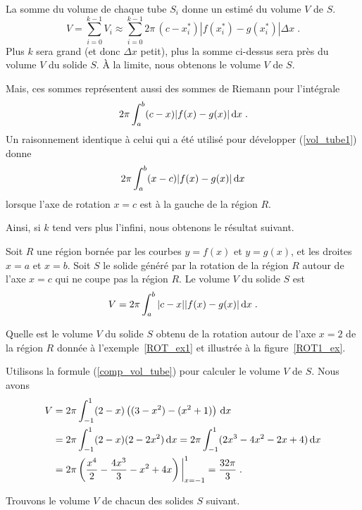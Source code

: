 {La somme du volume de chaque tube $S_i$ donne un estimé du volume $V$ de
$S$.
\[
V = \sum_{i=0}^{k-1} V_i \approx \sum_{i=0}^{k-1}
2 \pi \, (c-x_i^\ast) |f(x_i^\ast)-g(x_i^\ast)| \Delta x \; .
\]
Plus $k$ sera grand (et donc $\Delta x$ petit), plus la somme ci-dessus sera
près du volume $V$ du solide $S$.  À la limite, nous obtenons le volume $V$ de
$S$.

Mais, ces sommes représentent aussi des sommes de Riemann pour l'intégrale
\begin{equation}\label{vol_tube1}
2 \pi \int_a^b (c-x) |f(x)-g(x)| \,\mathrm{d}x \; .
\end{equation}
Un raisonnement identique à celui qui a été utilisé pour développer
(\ref{vol_tube1}) donne
\[
2 \pi \int_a^b (x-c) |f(x)-g(x)| \,\mathrm{d}x
\]
lorsque l'axe de rotation $x=c$ est à la gauche de la région $R$.

Ainsi, si $k$ tend vers plus l'infini, nous obtenons le résultat suivant.

\begin{meth}
Soit $R$ une région bornée par les courbes $y=f(x)$ et $y=g(x)$, et les
droites $x=a$ et $x=b$.  Soit $S$ le solide généré par la rotation de la
région $R$ autour de l'axe $x=c$ qui ne coupe pas la région $R$. Le volume
$V$ du solide $S$ est
\begin{equation}\label{comp_vol_tube}
V = 2 \pi \int_a^b |c-x| |f(x)-g(x)| \,\mathrm{d}x \; .
\end{equation}
\end{meth}

\begin{egg}
Quelle est le volume $V$ du solide $S$ obtenu de la rotation autour de l'axe
$x=2$ de la région $R$ donnée à l'exemple~\ref{ROT_ex1} et illustrée à la
figure~\ref{ROT1_ex}.

Utilisons la formule (\ref{comp_vol_tube}) pour calculer
le volume $V$ de $S$.  Nous avons
\begin{align*}
V &= 2 \pi \int_{-1}^1 (2-x) \left( (3-x^2) - (x^2+1) \right)\,\mathrm{d}x \\
&= 2 \pi \int_{-1}^1 (2-x) (2 - 2x^2) \,\mathrm{d}x
= 2 \pi \int_{-1}^1 (2x^3-4x^2-2x+4) \,\mathrm{d}x \\
&= 2\pi \left( \frac{x^4}{2} - \frac{4x^3}{3} - x^2 +
4x \right)\bigg|_{x=-1}^1 = \frac{32\pi}{3} \; .
\end{align*}
\end{egg}

\begin{egg}
Trouvons le volume $V$ de chacun des solides $S$ suivant.


\end{egg}}
